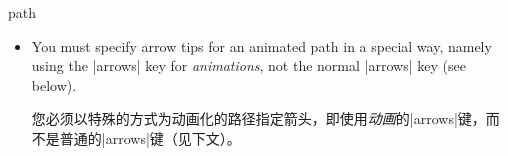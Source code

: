 \begin{tikzanimateattribute}{path}
\begin{itemize}
\begin{codeexample}[
    preamble={\usetikzlibrary{animations}},
    animation list={0.5,1,1.5,2},
]
\tikz \node :path = {
        0s = "{(0,0) circle [radius=1cm]}",
        2s = "{(0,0)
               (1,0) .. controls +(0,0) and +(0,0) .. (0,1)
                     .. controls +(0,0) and +(0,0) .. (-1,0)
                     .. controls +(0,0) and +(0,0) .. (0,-1)
                     .. controls +(0,0) and +(0,0) .. (1,0)
                     -- cycle (0,0)}",
        begin on=click}
  [fill = blue!20, draw = blue, ultra thick, circle] {Click me!};
\end{codeexample}
        \item You must specify arrow tips for an animated path in a special
            way, namely using the |arrows| key for \emph{animations}, not the
            normal |arrows| key (see below).

            您必须以特殊的方式为动画化的路径指定箭头，即使用\emph{动画}的|arrows|键，而不是普通的|arrows|键（见下文）。


    \end{itemize}
\end{tikzanimateattribute}

